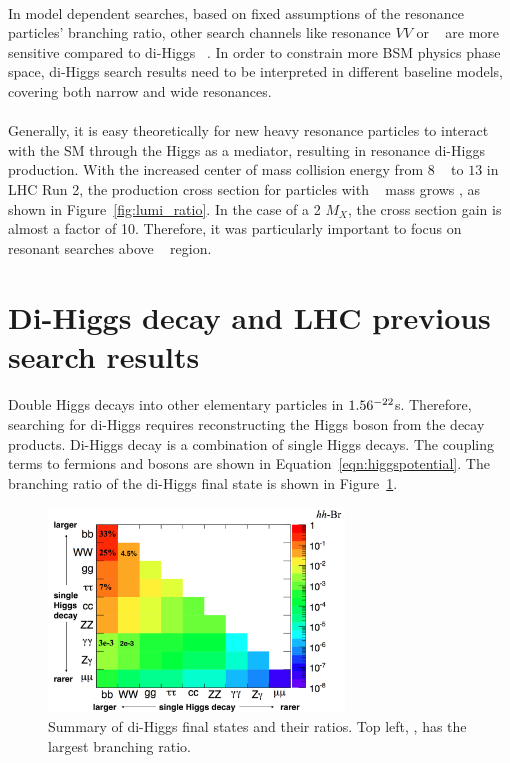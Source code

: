 \paragraph{}
In model dependent searches, based on fixed assumptions of the resonance particles' branching ratio, other search channels like resonance $VV$ or \ttbar~ are more sensitive compared to di-Higgs ~\cite{Cavaliere:2203605}. In order to constrain more BSM physics phase space, di-Higgs search results need to be interpreted in different baseline models, covering both narrow and wide resonances.

\paragraph{}
Generally, it is easy theoretically for new heavy resonance particles to interact with the SM through the Higgs as a mediator, resulting in resonance di-Higgs production. 
With the increased center of mass collision energy from $8$ \TeV~ to $13$ \TeV in LHC Run 2, the production cross section for particles with \TeV~ mass grows , as shown in Figure~\ref{fig:lumi_ratio}.
In the case of a 2 \TeV $M_X$, the cross section gain is almost a factor of 10. 
Therefore, it was particularly important to focus on resonant searches above \TeV~ region.


\section{Di-Higgs decay and LHC previous search results}
\paragraph{}
Double Higgs decays into other elementary particles in $1.56 \time 10 ^{-22}$s.
Therefore, searching for di-Higgs requires reconstructing the Higgs boson from the decay products.
Di-Higgs decay is a combination of single Higgs decays. The coupling terms to fermions and bosons are shown in Equation~\ref{eqn:higgspotential}. 
The branching ratio of the di-Higgs final state is shown in Figure~\ref{fig:HH_BR}.

\begin{figure}[htbp!]
  \centering
  \includegraphics[width=0.7\textwidth]{figures/theory/HH_BR}
  \caption{Summary of di-Higgs final states and their ratios. Top left, \bbbb, has the largest branching ratio.}
  \label{fig:HH_BR}
\end{figure}

